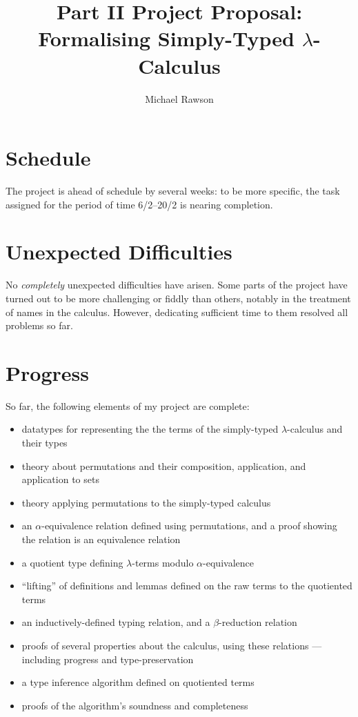 \documentclass[12pt]{article}
\title{Part II Project Proposal: Formalising Simply-Typed \(\lambda\)-Calculus}
\author{Michael Rawson}
\begin{document}

\section*{Schedule}
The project is ahead of schedule by several weeks: to be more specific, the task assigned for the period of time 6/2--20/2 is nearing completion.

\section*{Unexpected Difficulties}
No \emph{completely} unexpected difficulties have arisen.
Some parts of the project have turned out to be more challenging or fiddly than others, notably in the treatment of names in the calculus.
However, dedicating sufficient time to them resolved all problems so far.

\section*{Progress}
So far, the following elements of my project are complete:
\begin{itemize}
\item
datatypes for representing the the terms of the simply-typed $\lambda$-calculus and their types
\item
theory about permutations and their composition, application, and application to sets
\item
theory applying permutations to the simply-typed calculus
\item
an $\alpha$-equivalence relation defined using permutations, and a proof showing the relation is an equivalence relation
\item
a quotient type defining $\lambda$-terms modulo $\alpha$-equivalence
\item
``lifting'' of definitions and lemmas defined on the raw terms to the quotiented terms
\item
an inductively-defined typing relation, and a $\beta$-reduction relation
\item
proofs of several properties about the calculus, using these relations --- including progress and type-preservation
\item
a type inference algorithm defined on quotiented terms
\item
proofs of the algorithm's soundness and completeness
\end{itemize}
\end{document}
